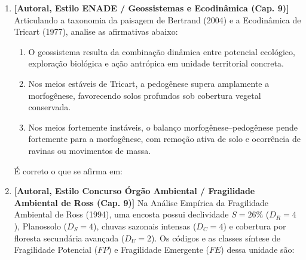 \begin{enumerate}[leftmargin=1.8em, itemsep=6pt]
  \item \textbf{[Autoral, Estilo ENADE / Geossistemas e Ecodinâmica (Cap. 9)]} Articulando a taxonomia da paisagem de Bertrand (2004) e a Ecodinâmica de Tricart (1977), analise as afirmativas abaixo:
  \begin{enumerate}[label=\Roman*., leftmargin=2.0em, itemsep=2pt]
    \item O geossistema resulta da combinação dinâmica entre potencial ecológico, exploração biológica e ação antrópica em unidade territorial concreta.
    \item Nos meios estáveis de Tricart, a pedogênese supera amplamente a morfogênese, favorecendo solos profundos sob cobertura vegetal conservada.
    \item Nos meios fortemente instáveis, o balanço morfogênese--pedogênese pende fortemente para a morfogênese, com remoção ativa de solo e ocorrência de ravinas ou movimentos de massa.
  \end{enumerate}
  É correto o que se afirma em:
  \espacoResolucao[1.1cm]

  \item \textbf{[Autoral, Estilo Concurso Órgão Ambiental / Fragilidade Ambiental de Ross (Cap. 9)]} Na Análise Empírica da Fragilidade Ambiental de Ross (1994), uma encosta possui declividade $S = 26\%$ ($D_R = 4$), Planossolo ($D_S = 4$), chuvas sazonais intensas ($D_C = 4$) e cobertura por floresta secundária avançada ($D_U = 2$). Os códigos e as classes síntese de Fragilidade Potencial ($FP$) e Fragilidade Emergente ($FE$) dessa unidade são:
  \espacoResolucao[1.3cm]
\end{enumerate}

